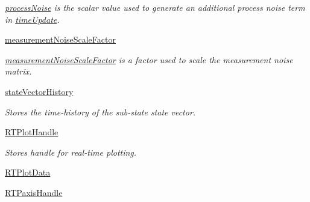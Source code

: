 \begin{DoxyCompactItemize}
\begin{DoxyCompactList}\small\item\em \hyperlink{classmodest_1_1substates_1_1CorrelationVector_1_1CorrelationVector_a975d7f4a8ff295bad20c31dee8fe0370}{process\+Noise} is the scalar value used to generate an additional process noise term in \hyperlink{classmodest_1_1substates_1_1CorrelationVector_1_1CorrelationVector_a5eb64d242f27e54ed924a957238376b9}{time\+Update}. \end{DoxyCompactList}\item 
\hyperlink{classmodest_1_1substates_1_1CorrelationVector_1_1CorrelationVector_a739a70da1ddef21b637a546619e31895}{measurement\+Noise\+Scale\+Factor}
\begin{DoxyCompactList}\small\item\em \hyperlink{classmodest_1_1substates_1_1CorrelationVector_1_1CorrelationVector_a739a70da1ddef21b637a546619e31895}{measurement\+Noise\+Scale\+Factor} is a factor used to scale the measurement noise matrix. \end{DoxyCompactList}\item 
\hyperlink{classmodest_1_1substates_1_1SubState_1_1SubState_acb24540b23c1fb76233b6b4ff5bf47ce}{state\+Vector\+History}
\begin{DoxyCompactList}\small\item\em Stores the time-\/history of the sub-\/state state vector. \end{DoxyCompactList}\item 
\hyperlink{classmodest_1_1substates_1_1SubState_1_1SubState_a28d5d778050affd247711bab8b126e80}{R\+T\+Plot\+Handle}
\begin{DoxyCompactList}\small\item\em Stores handle for real-\/time plotting. \end{DoxyCompactList}\item 
\hyperlink{classmodest_1_1substates_1_1SubState_1_1SubState_a7f639244937fbae85f58ac478b0528c0}{R\+T\+Plot\+Data}
\item 
\hyperlink{classmodest_1_1substates_1_1SubState_1_1SubState_a914ef37afe2f8ab5c2ee9a6f4d898553}{R\+T\+Paxis\+Handle}
\end{DoxyCompactItemize}
